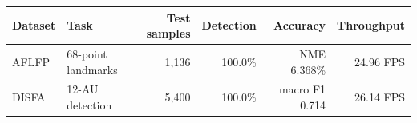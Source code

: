 \begin{tabular}{llrrrr}
\toprule
Dataset & Task & Test samples & Detection & Accuracy & Throughput \\
\midrule
AFLFP & 68-point landmarks & 1,136 & 100.0\% & NME 6.368\% & 24.96 FPS \\
DISFA & 12-AU detection & 5,400 & 100.0\% & macro F1 0.714 & 26.14 FPS \\
\bottomrule
\end{tabular}
